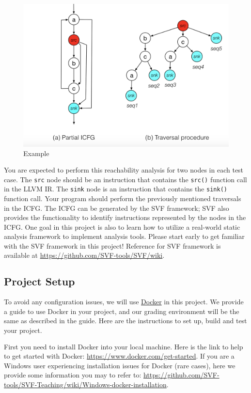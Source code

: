 \documentclass[12pt]{article}
\newcommand{\codeIn}[1]{{\small\tt{#1}}}
\begin{document}
\begin{figure}[htpb]
    \centering
    \includegraphics[scale=0.6]{icfgCase1.png}
    \caption{Example}
    \label{case1}
\end{figure}

You are expected to perform this reachability analysis for
two nodes in each test case. The \codeIn{src} node should be an instruction that contains the \codeIn{src()} function call in the LLVM IR. The \codeIn{sink} node is an instruction that contains the \codeIn{sink()} function call. Your program should
perform the previously mentioned traversals in the ICFG. The ICFG  can be generated by the SVF framework; SVF also provides the functionality to identify instructions represented by the nodes in the ICFG.
One goal in this project is also to learn how to utilize
a real-world static analysis framework to implement analysis
tools. Please start early to get familiar with the SVF framework in this project!
Reference for SVF framework is available at \url{https://github.com/SVF-tools/SVF/wiki}.

\subsection{Project Setup}\label{sec:setup}
To avoid any configuration issues, we will use \href{https://www.docker.com/}{Docker} in this project. We provide a guide to use Docker in your project, and our grading environment will be the same as described in the guide. Here are the instructions to set up, build and test your project.

First you need to install Docker into your local machine. Here is the link to help to get started with Docker: \url{https://www.docker.com/get-started}. If you are a Windows user experiencing installation issues for Docker (rare cases), here we provide some information you may to refer to: \url{https://github.com/SVF-tools/SVF-Teaching/wiki/Windows-docker-installation}.
\end{document}
